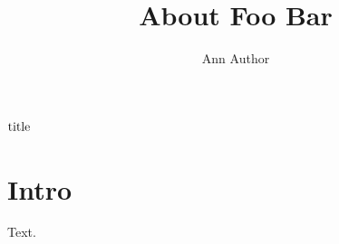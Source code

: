 \documentclass{article}
\title{About Foo Bar}\author{Ann Author}
\begin{document}
\begin{center}\end{center}
$\mbox{\StrRight{\@title}{8}}$
\maketitle
\section{Intro}
Text.
\end{document}
